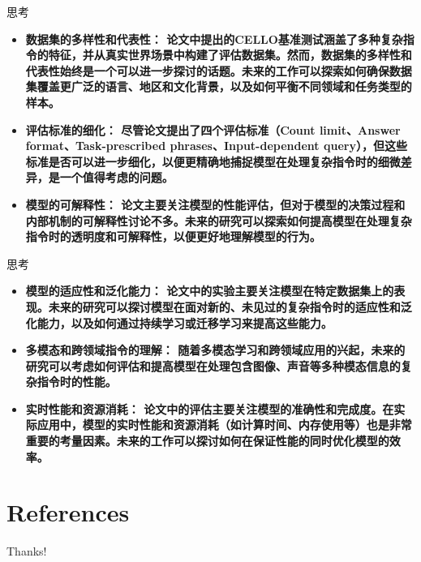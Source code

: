 \documentclass{beamer}
\begin{document}
\begin{frame}{思考}
    \begin{itemize}
        \item {\bfseries{数据集的多样性和代表性：}\normalfont
        论文中提出的CELLO基准测试涵盖了多种复杂指令的特征，并从真实世界场景中构建了评估数据集。然而，数据集的多样性和代表性始终是一个可以进一步探讨的话题。未来的工作可以探索如何确保数据集覆盖更广泛的语言、地区和文化背景，以及如何平衡不同领域和任务类型的样本。}
        \item {\bfseries{评估标准的细化：}\normalfont
        尽管论文提出了四个评估标准（Count limit、Answer format、Task-prescribed phrases、Input-dependent query），但这些标准是否可以进一步细化，以便更精确地捕捉模型在处理复杂指令时的细微差异，是一个值得考虑的问题。}
        \item {\bfseries{模型的可解释性：}\normalfont
        论文主要关注模型的性能评估，但对于模型的决策过程和内部机制的可解释性讨论不多。未来的研究可以探索如何提高模型在处理复杂指令时的透明度和可解释性，以便更好地理解模型的行为。}
    \end{itemize}
\end{frame}

\begin{frame}{思考}
    \begin{itemize}
        \item {\bfseries{模型的适应性和泛化能力：}\normalfont
        论文中的实验主要关注模型在特定数据集上的表现。未来的研究可以探讨模型在面对新的、未见过的复杂指令时的适应性和泛化能力，以及如何通过持续学习或迁移学习来提高这些能力。}
        \item {\bfseries{多模态和跨领域指令的理解：}\normalfont
        随着多模态学习和跨领域应用的兴起，未来的研究可以考虑如何评估和提高模型在处理包含图像、声音等多种模态信息的复杂指令时的性能。}
        \item {\bfseries{实时性能和资源消耗：}\normalfont
        论文中的评估主要关注模型的准确性和完成度。在实际应用中，模型的实时性能和资源消耗（如计算时间、内存使用等）也是非常重要的考量因素。未来的工作可以探讨如何在保证性能的同时优化模型的效率。}
    \end{itemize}
\end{frame}

\section{References}

\begin{frame}[allowframebreaks]
    \nocite{*} %
    
    
\end{frame}

\begin{frame}
    \begin{center}
        {\Huge\calligra Thanks!}
    \end{center}
\end{frame}
\end{document}
